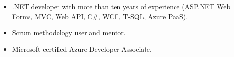\begin{itemize}
    \item .NET developer with more than ten years of experience (ASP.NET Web Forms, MVC, Web API, C\#, WCF, T-SQL, Azure PaaS).
    \item Scrum methodology user and mentor.
    \item Microsoft certified Azure Developer Associate.
\end{itemize}